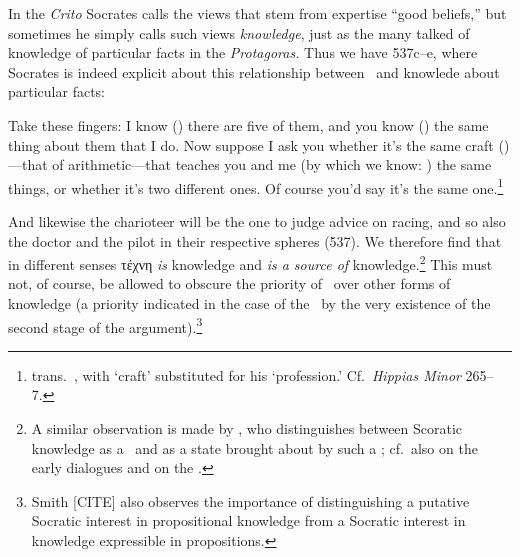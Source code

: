 \documentclass[11pt,letterpaper,oneside]{amsart} %
\begin{document}
In the \emph{Crito} Socrates calls the views that stem from expertise ``good beliefs,'' but sometimes he simply calls such views \emph{knowledge}, just as the many talked of knowledge of particular facts in the \emph{Protagoras.} Thus we have  537c--e, where Socrates is indeed explicit about this relationship between \techne\ and knowlede about particular facts:\begin{squote}Take these fingers: I know (\gignoskein) there are five of them, and you know (\gignoskein) the same thing about them that I do. Now suppose I ask you whether it's the same craft (\techne)---that of arithmetic---that teaches you and me (\ie by which we know: \gignoskein) the same things, or whether it's two different ones. Of course you'd say it's the same one.\footnote{trans.\ , with `craft' substituted for his `profession.' Cf.\ \emph{Hippias Minor} 265--7.}\end{squote} And likewise the charioteer will be the one to judge advice on racing, and so also the doctor and the pilot in their respective spheres (537). We therefore find that in different senses τέχνη \emph{is} knowledge and \emph{is a source of} knowledge.\footnote{A similar observation is made by \citet[pp.\ 205--11]{benson2000swm}, who distinguishes between Scoratic knowledge as a \dunamis\ and as a state brought about by such a \dunamis; cf.\ also \citet[p.\ 37]{brickhouse1994pss} on the early dialogues and \citet{smith2000power} on the .} This must not, of course, be allowed to obscure the priority of \techne\ over other forms of knowledge (a priority indicated in the case of the \prot\ by the very existence of the second stage of the argument).\footnote{Smith [CITE] also observes the importance of distinguishing a putative Socratic interest in propositional knowledge from a Socratic interest in knowledge expressible in propositions.}






\end{document}
